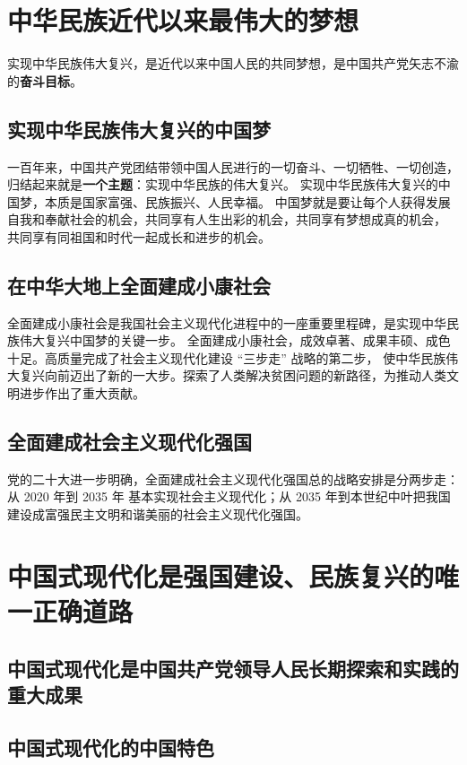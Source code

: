 \documentclass[UTF8,10pt]{ctexbook} %
\begin{document}
\section{中华民族近代以来最伟大的梦想}

实现中华民族伟大复兴，是近代以来中国人民的共同梦想，是中国共产党矢志不渝的\textbf{奋斗目标}。

\subsection{实现中华民族伟大复兴的中国梦}

一百年来，中国共产党团结带领中国人民进行的一切奋斗、一切牺牲、一切创造，
归结起来就是\textbf{一个主题}：实现中华民族的伟大复兴。
实现中华民族伟大复兴的中国梦，本质是国家富强、民族振兴、人民幸福。
中国梦就是要让每个人获得发展自我和奉献社会的机会，共同享有人生出彩的机会，共同享有梦想成真的机会，
共同享有同祖国和时代一起成长和进步的机会。

\subsection{在中华大地上全面建成小康社会}

全面建成小康社会是我国社会主义现代化进程中的一座重要里程碑，是实现中华民族伟大复兴中国梦的关键一步。
全面建成小康社会，成效卓著、成果丰硕、成色十足。高质量完成了社会主义现代化建设 “三步走” 战略的第二步，
使中华民族伟大复兴向前迈出了新的一大步。探索了人类解决贫困问题的新路径，为推动人类文明进步作出了重大贡献。

\subsection{全面建成社会主义现代化强国}

党的二十大进一步明确，全面建成社会主义现代化强国总的战略安排是分两步走：从 2020 年到 2035 年
基本实现社会主义现代化；从 2035 年到本世纪中叶把我国建设成富强民主文明和谐美丽的社会主义现代化强国。

\section{中国式现代化是强国建设、民族复兴的唯一正确道路}

\subsection{中国式现代化是中国共产党领导人民长期探索和实践的重大成果}
\subsection{中国式现代化的中国特色}
\end{document}
